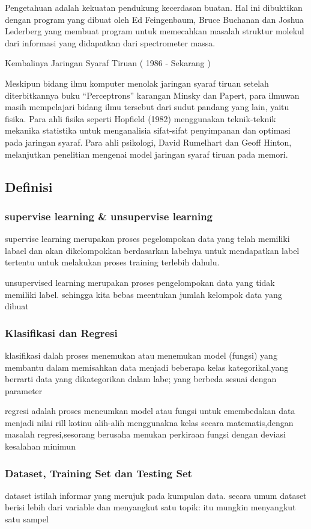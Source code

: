 \documentclass{homework}
\begin{document}
\text Pengetahuan adalah kekuatan pendukung kecerdasan buatan. Hal ini dibuktikan dengan program yang dibuat oleh Ed Feingenbaum, Bruce Buchanan dan Joshua Lederberg yang membuat program untuk memecahkan masalah struktur molekul dari informasi yang didapatkan dari spectrometer massa.

Kembalinya Jaringan Syaraf Tiruan ( 1986 - Sekarang )

\text Meskipun bidang ilmu komputer menolak jaringan syaraf tiruan setelah diterbitkannya buku “Perceptrons” karangan Minsky dan Papert, para ilmuwan masih mempelajari bidang ilmu tersebut dari sudut pandang yang lain, yaitu fisika. Para ahli fisika seperti Hopfield (1982) menggunakan teknik-teknik mekanika statistika untuk menganalisia sifat-sifat penyimpanan dan optimasi pada jaringan syaraf. Para ahli psikologi, David Rumelhart dan Geoff Hinton, melanjutkan penelitian mengenai model jaringan syaraf tiruan pada memori.

\subsection{Definisi}
\subsubsection{supervise learning & unsupervise learning} supervise learning merupakan proses pegelompokan data yang telah memiliki labael dan akan dikelompokkan berdasarkan labelnya untuk mendapatkan label tertentu  untuk melakukan proses training terlebih dahulu.

unsupervised learning merupakan proses pengelompokan data yang tidak memiliki label. sehingga kita bebas meentukan jumlah kelompok data yang dibuat

\subsubsection{Klasifikasi dan Regresi}
\text klasifikasi dalah proses menemukan atau menemukan model (fungsi) yang membantu dalam memisahkan data menjadi beberapa kelas kategorikal.yang berrarti data yang dikategorikan dalam labe; yang berbeda sesuai dengan parameter

regresi adalah proses meneumkan model atau fungsi untuk emembedakan data menjadi nilai rill kotinu alih-alih menggunakna kelas secara matematis,dengan masalah regresi,sesorang berusaha menukan perkiraan fungsi dengan deviasi kesalahan minimun

\subsubsection{Dataset, Training Set dan Testing Set}
\text dataset istilah informar yang merujuk pada kumpulan data. secara umum dataset berisi lebih dari variable dan menyangkut satu topik: itu mungkin menyangkut satu sampel
\end{document}
